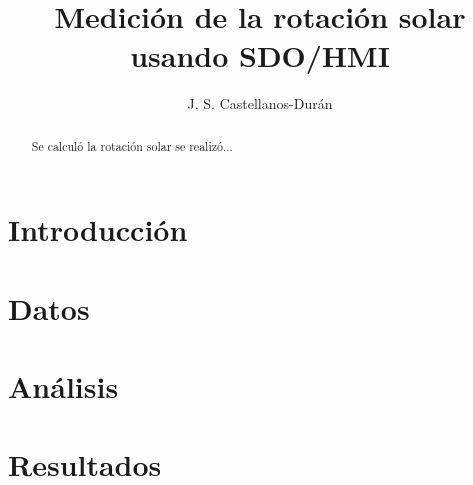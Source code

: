 \documentclass[12pt,letterpaper]{article}
\author{J. S. Castellanos-Durán}
\title{Medición de la rotación solar usando SDO/HMI}
\date{}
\begin{document}
 \maketitle
 
 \begin{abstract}
 Se calculó la rotación solar  se realizó...
 \end{abstract}
 
 \section{Introducción}
 \citep{Howard1990}
 \section{Datos}
 
 \section{Análisis}
 
 \section{Resultados}
 
 
 
 
 
\end{document}
